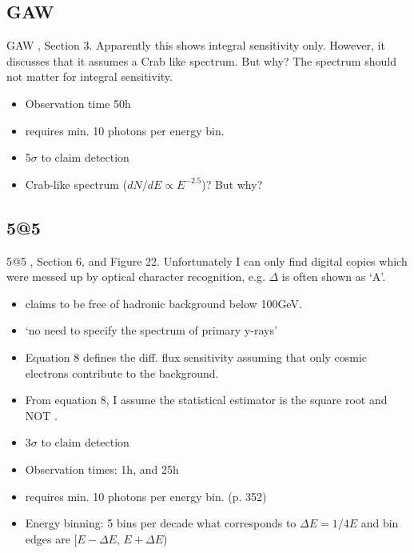 \documentclass{article}%
\begin{document}
        \subsection{GAW}
            GAW \citep{cusumano2001gaw}, Section 3. Apparently this shows integral sensitivity only. However, it discusses that it assumes a Crab like spectrum. But why? The spectrum should not matter for integral sensitivity.
            \begin{itemize}
                \item Observation time 50h
                \item requires min. 10 photons per energy bin.
                \item 5$\sigma$ to claim detection
                \item Crab-like spectrum ($dN/dE \propto E^{-2.5}$)? But why?
            \end{itemize}
        \subsection{5@5}
            5@5 \citep{aharonian2001}, Section 6, and Figure 22. Unfortunately I can only find digital copies which were messed up by optical character recognition, e.g. $\Delta$ is often shown as `A'.
            \begin{itemize}
                \item claims to be free of hadronic background below 100GeV.
                \item `no need to specify the spectrum of primary y-rays'
                \item Equation 8 defines the diff. flux sensitivity assuming that only cosmic electrons contribute to the background.
                \item From equation 8, I assume the statistical estimator is the square root and NOT \citep{li1983analysis}.
                \item 3$\sigma$ to claim detection
                \item Observation times: 1h, and 25h
                \item requires min. 10 photons per energy bin. (p. 352)
                \item Energy binning: 5 bins per decade what corresponds to $\Delta E = 1/4 E$ and bin edges are [$E-\Delta E$, $E + \Delta E$)
            \end{itemize}
\end{document}
